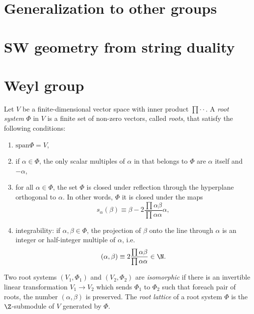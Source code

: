 \documentclass{worksheetclass}
\begin{document}
\section{Generalization to other groups}

\section{SW geometry from string duality}

\appendix

\section{Weyl group}

    Let $V$ be a finite-dimensional vector space with inner product $\prod{\cdot}{\cdot}$. A \emph{root system} $\Phi$ in $V$ is a finite set of non-zero vectors, called \emph{roots}, that satisfy the following conditions:
    \begin{enumerate}
        \item $\text{span}\Phi=V$,
        \item if $\alpha\in\Phi$, the only scalar multiples of $\alpha$ in that belongs to $\Phi$ are $\alpha$ itself and $-\alpha$,
        \item for all $\alpha\in\Phi$, the set $\Phi$ is closed under reflection through the hyperplane orthogonal to $\alpha$. In other words, $\Phi$ it is closed under the maps
        \begin{equation}
            s_\alpha(\beta)\equiv\beta-2\frac{\prod{\alpha}{\beta}}{\prod{\alpha}{\alpha}}\alpha,
        \end{equation}
        \item integrability: if $\alpha,\beta\in\Phi$, the projection of $\beta$ onto the line through $\alpha$ is an integer or half-integer multiple of $\alpha$, i.e.
        \begin{equation}
            (\alpha,\beta)\equiv 2\frac{\prod{\alpha}{\beta}}{\prod{\alpha}{\alpha}}\in\N.
        \end{equation}
    \end{enumerate}
    Two root systems $(V_1,\Phi_1)$ and $(V_2,\Phi_2)$ are \emph{isomorphic} if there is an invertible linear transformation $V_1\to V_2$ which sends $\Phi_1$ to $\Phi_2$ such that foreach pair of roots, the number $(\alpha,\beta)$ is preserved. The \emph{root lattice} of a root system $\Phi$ is the $\Z$-submodule of $V$ generated by $\Phi$.
\end{document}
